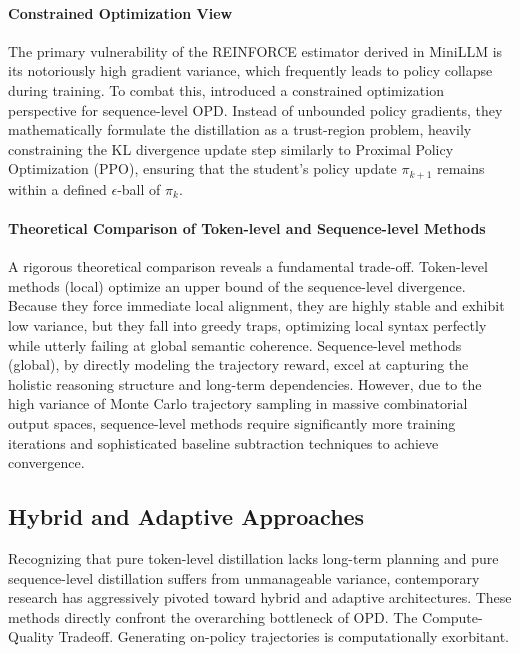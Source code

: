 \documentclass{article} %
\begin{document}
\paragraph{Constrained Optimization View}
The primary vulnerability of the REINFORCE estimator derived in MiniLLM is its notoriously high gradient variance, which frequently leads to policy collapse during training. To combat this, \citet{2509.22921} introduced a constrained optimization perspective for sequence-level OPD. Instead of unbounded policy gradients, they mathematically formulate the distillation as a trust-region problem, heavily constraining the KL divergence update step similarly to Proximal Policy Optimization (PPO), ensuring that the student's policy update $\pi_{k+1}$ remains within a defined $\epsilon$-ball of $\pi_k$.

\paragraph{Theoretical Comparison of Token-level and Sequence-level Methods}
A rigorous theoretical comparison reveals a fundamental trade-off. Token-level methods (local) optimize an upper bound of the sequence-level divergence. Because they force immediate local alignment, they are highly stable and exhibit low variance, but they fall into greedy traps, optimizing local syntax perfectly while utterly failing at global semantic coherence. Sequence-level methods (global), by directly modeling the trajectory reward, excel at capturing the holistic reasoning structure and long-term dependencies. However, due to the high variance of Monte Carlo trajectory sampling in massive combinatorial output spaces, sequence-level methods require significantly more training iterations and sophisticated baseline subtraction techniques to achieve convergence.

\subsection{Hybrid and Adaptive Approaches}
\label{subsec:hybrid}

Recognizing that pure token-level distillation lacks long-term planning and pure sequence-level distillation suffers from unmanageable variance, contemporary research has aggressively pivoted toward hybrid and adaptive architectures. These methods directly confront the overarching bottleneck of OPD. The Compute-Quality Tradeoff. Generating on-policy trajectories is computationally exorbitant.
\end{document}
